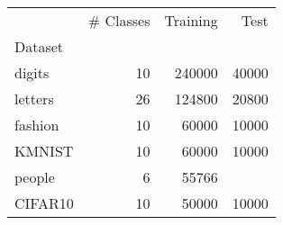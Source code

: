\begin{tabular}{lrrr}
\toprule
{} & {# Classes} & {Training} & {Test} \\
{Dataset} & {} & {} & {} \\
\midrule
digits & 10 & 240000 & 40000 \\
letters & 26 & 124800 & 20800 \\
fashion & 10 & 60000 & 10000 \\
KMNIST & 10 & 60000 & 10000 \\
people & 6 & 55766 & \\
CIFAR10 & 10 & 50000 & 10000 \\
\bottomrule
\end{tabular}
